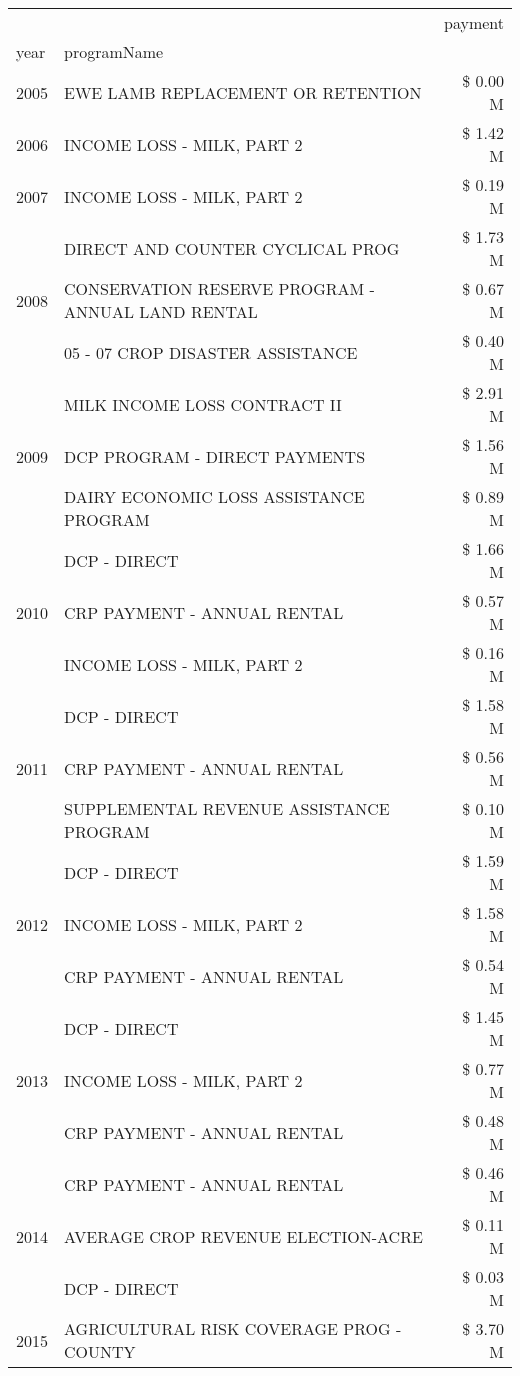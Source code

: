 \begin{tabular}{llr}
\toprule
 &  & payment \\
year & programName &  \\
\midrule
2005 & EWE LAMB REPLACEMENT OR RETENTION & \$ 0.00 M \\
\cline{1-3}
2006 & INCOME LOSS - MILK, PART 2 & \$ 1.42 M \\
\cline{1-3}
2007 & INCOME LOSS - MILK, PART 2 & \$ 0.19 M \\
\cline{1-3}
\multirow[t]{3}{*}{2008} & DIRECT AND COUNTER CYCLICAL PROG & \$ 1.73 M \\
 & CONSERVATION RESERVE PROGRAM - ANNUAL LAND RENTAL & \$ 0.67 M \\
 & 05 - 07 CROP DISASTER ASSISTANCE & \$ 0.40 M \\
\cline{1-3}
\multirow[t]{3}{*}{2009} & MILK INCOME LOSS CONTRACT II & \$ 2.91 M \\
 & DCP PROGRAM - DIRECT PAYMENTS & \$ 1.56 M \\
 & DAIRY ECONOMIC LOSS ASSISTANCE PROGRAM & \$ 0.89 M \\
\cline{1-3}
\multirow[t]{3}{*}{2010} & DCP - DIRECT & \$ 1.66 M \\
 & CRP PAYMENT - ANNUAL RENTAL & \$ 0.57 M \\
 & INCOME LOSS - MILK, PART 2 & \$ 0.16 M \\
\cline{1-3}
\multirow[t]{3}{*}{2011} & DCP - DIRECT & \$ 1.58 M \\
 & CRP PAYMENT - ANNUAL RENTAL & \$ 0.56 M \\
 & SUPPLEMENTAL REVENUE ASSISTANCE PROGRAM & \$ 0.10 M \\
\cline{1-3}
\multirow[t]{3}{*}{2012} & DCP - DIRECT & \$ 1.59 M \\
 & INCOME LOSS - MILK, PART 2 & \$ 1.58 M \\
 & CRP PAYMENT - ANNUAL RENTAL & \$ 0.54 M \\
\cline{1-3}
\multirow[t]{3}{*}{2013} & DCP - DIRECT & \$ 1.45 M \\
 & INCOME LOSS - MILK, PART 2 & \$ 0.77 M \\
 & CRP PAYMENT - ANNUAL RENTAL & \$ 0.48 M \\
\cline{1-3}
\multirow[t]{3}{*}{2014} & CRP PAYMENT - ANNUAL RENTAL & \$ 0.46 M \\
 & AVERAGE CROP REVENUE ELECTION-ACRE & \$ 0.11 M \\
 & DCP - DIRECT & \$ 0.03 M \\
\cline{1-3}
\multirow[t]{3}{*}{2015} & AGRICULTURAL RISK COVERAGE PROG - COUNTY & \$ 3.70 M \\

\end{tabular}

